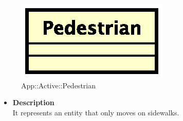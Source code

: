 \begin{figure}[h]
\centering
\includegraphics[scale=0.6,keepaspectratio]{images/solution/pedestrian.eps}
\caption{App::Active::Pedestrian}
\label{fig:sd-app-pedestrian}
\end{figure}
\FloatBarrier
\begin{itemize}
  \item \textbf{Description} \\
It represents an entity that only moves on sidewalks.
\end{itemize} 

